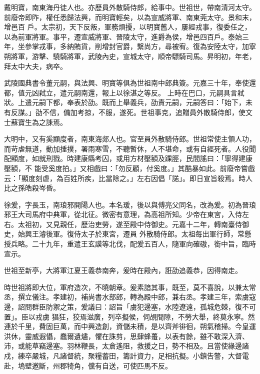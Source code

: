 \begin{pinyinscope}
 戴明寶，南東海丹徒人也。亦歷員外散騎侍郎，給事中。世祖世，帶南清河太守。前廢帝即阼，權任悉歸法興，而明寶輕矣，以為宣威將軍、南東莞太守。景和末，增邑百
 戶。太宗初，天下反叛，軍務煩擾，以明寶舊人，屢經戎事，復委任之，以為前軍將軍。事平，遷宣威將軍、晉陵太守，進爵為侯，增邑四百戶。泰始三年，坐參掌戎事，多納賄貨，削增封官爵，繫尚方，尋被宥。復為安陸太守，加寧朔將軍，游擊、驍騎將軍，武陵內史，宣城太守，順帝驃騎司馬。昇明初，年老，拜太中大夫，病卒。



 武陵國典書令董元嗣，與法興、明寶等俱為世祖南中郎典簽。元嘉三十年，奉使還都，值元凶弒立，遣元嗣南還，報上以徐湛之等反。
 上時在巴口，元嗣具言弒狀。上遣元嗣下都，奉表於劭。既而上舉義兵，劭責元嗣，元嗣答曰：「始下，未有反謀。」劭不信，備加考掠，不服，遂死。世祖事克，追贈員外散騎侍郎，使文士蘇寶生為之誄焉。



 大明中，又有奚顯度者，南東海郯人也。官至員外散騎侍郎。世祖常使主領人功，而苛虐無道，動加捶撲，署雨寒雪，不聽暫休，人不堪命，或有自經死者。人役聞配顯度，如就刑戮。時建康縣考囚，或用方材壓額及踝脛，民間謠曰：「寧得建康壓額，不
 能受奚度拍。」又相戲曰：「勿反顧，付奚度。」其酷暴如此。前廢帝嘗戲云：「顯度刻虐，為百姓所疾，比當除之。」左右因倡「諾」。即日宣旨殺焉。時人比之孫皓殺岑昏。



 徐爰，字長玉，南琅邪開陽人也。本名瑗，後以與傅亮父同名，改為爰。初為晉琅邪王大司馬府中典軍，從北征。微密有意理，為高祖所知。少帝在東宮，入侍左右。太祖初，又見親任，歷治吏勞，遂至殿中侍御史。元嘉十二年，轉南臺侍御史，始興王濬後軍。復侍太子於東宮，遷員
 外散騎侍郎。太祖每出軍行師，常懸授兵略。二十九年，重遣王玄謨等北伐，配爰五百人，隨軍向確磝，銜中旨，臨時宣示。



 世祖至新亭，大將軍江夏王義恭南奔，爰時在殿內，誑劭追義恭，因得南走。



 時世祖將即大位，軍府造次，不曉朝章。爰素諳其事，既至，莫不喜說，以兼太常丞，撰立儀注。孝建初，補尚書水部郎，轉為殿中郎，兼右丞。孝建三年，索虜寇邊，詔問群臣防禦之策，爰議曰：詔旨「虜犯邊塞，水陸遼遠，孤城危棘，復不可置」。臣以戎虜
 猖狂，狡焉滋廣，列卒擬候，伺覘間隙，不勞大舉，終莫永寧。然連於千里，費固巨萬，而中興造創，資儲未積，是以齊斧徘徊，朔氣稽掃。今皇運洪休，靈威遐懾，蠢爾遺燼，懼在誅剪，思肆蜂蠆，以表有餘，雖不敢深入濟、沛，或能草竊邊塞。羽林鞭長，太倉遙阻，救援之日，勢不相及。且當使緣邊諸戍，練卒嚴城，凡諸督統，聚糧蓄田，籌計資力，足相抗擬。小鎮告警，大督電赴，塢壁邀斷，州郡犄角，儻有自送，可使匹馬不反。




\end{pinyinscope}
